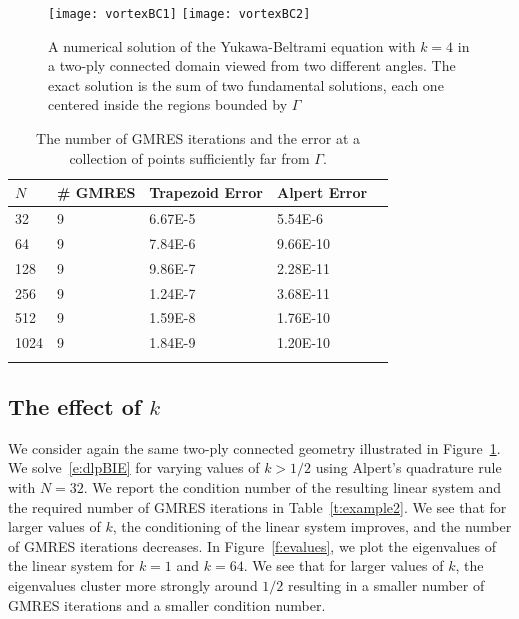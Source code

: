 \begin{figure}[htps]
  \texttt{[image: vortexBC1]}
  \texttt{[image: vortexBC2]}
\caption{\label{f:twoply} A numerical solution of the Yukawa-Beltrami
equation with $k=4$ in a two-ply connected domain viewed from two
different angles.  The exact solution is the sum of two fundamental
solutions, each one centered inside the regions bounded by $\Gamma$}
\end{figure}

\begin{table}[htps]
\caption{\label{t:example1} The number of GMRES iterations and the
error at a collection of points sufficiently far from $\Gamma$.}
\centering
\begin{tabular*}{0.8\textwidth}{@{\extracolsep{\fill}}lllll}
$N$ & \# GMRES & Trapezoid Error & Alpert Error  \\
\hline\noalign{\smallskip}
32   & 9 & 6.67E-5 & 5.54E-6  \\
64   & 9 & 7.84E-6 & 9.66E-10 \\
128  & 9 & 9.86E-7 & 2.28E-11 \\
256  & 9 & 1.24E-7 & 3.68E-11 \\
512  & 9 & 1.59E-8 & 1.76E-10 \\  
1024 & 9 & 1.84E-9 & 1.20E-10 \\ 
\noalign{\smallskip}\hline
\end{tabular*}
\end{table}

\subsection{The effect of $k$}
We consider again the same two-ply connected geometry illustrated in
Figure~\ref{f:twoply}.  We solve~\eqref{e:dlpBIE} for varying values of
$k > 1/2$ using Alpert's quadrature rule with $N=32$.  We report the
condition number of the resulting linear system and the required number
of GMRES iterations in Table~\ref{t:example2}.  We see that for larger
values of $k$, the conditioning of the linear system improves, and the
number of GMRES iterations decreases.  In Figure~\ref{f:evalues}, we
plot the eigenvalues of the linear system for $k=1$ and $k=64$.  We see
that for larger values of $k$, the eigenvalues cluster more strongly
around $1/2$ resulting in a smaller number of GMRES iterations and
a smaller condition number.

